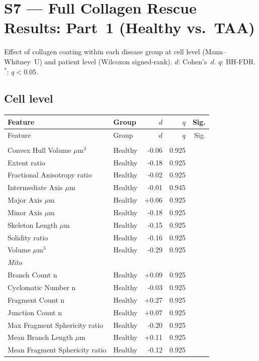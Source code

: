 \documentclass[11pt,a4paper]{article}
\begin{document}
\section*{S7 — Full Collagen Rescue Results: Part~1 (Healthy vs.\ TAA)}
Effect of collagen coating within each disease group at cell level (Mann--Whitney~U)
and patient level (Wilcoxon signed-rank). $d$: Cohen's~$d$. $q$: BH-FDR. $^{*}$: $q<0.05$.
\vspace{1em}
\subsection*{Cell level}
\begin{longtable}{llrrr}
\toprule
Feature & Group & $d$ & $q$ & Sig. \\
\midrule\endfirsthead
\toprule Feature & Group & $d$ & $q$ & Sig. \\\midrule\endhead
\bottomrule\endfoot
\multicolumn{5}{l}{\textit{Actin}} \\
  Convex Hull Volume $\mu$m$^{3}$ & Healthy & -0.06 & 0.925 &  \\
  Extent ratio & Healthy & -0.18 & 0.925 &  \\
  Fractional Anisotropy ratio & Healthy & -0.02 & 0.925 &  \\
  Intermediate Axis $\mu$m & Healthy & -0.01 & 0.945 &  \\
  Major Axis $\mu$m & Healthy & +0.06 & 0.925 &  \\
  Minor Axis $\mu$m & Healthy & -0.18 & 0.925 &  \\
  Skeleton Length $\mu$m & Healthy & -0.15 & 0.925 &  \\
  Solidity ratio & Healthy & -0.16 & 0.925 &  \\
  Volume $\mu$m$^{3}$ & Healthy & -0.29 & 0.925 &  \\
\midrule
\multicolumn{5}{l}{\textit{Mito}} \\
  Branch Count n & Healthy & +0.09 & 0.925 &  \\
  Cyclomatic Number n & Healthy & -0.03 & 0.925 &  \\
  Fragment Count n & Healthy & +0.27 & 0.925 &  \\
  Junction Count n & Healthy & +0.07 & 0.925 &  \\
  Max Fragment Sphericity ratio & Healthy & -0.20 & 0.925 &  \\
  Mean Branch Length $\mu$m & Healthy & +0.11 & 0.925 &  \\
  Mean Fragment Sphericity ratio & Healthy & -0.12 & 0.925 &  \\

\end{longtable}
\end{document}
